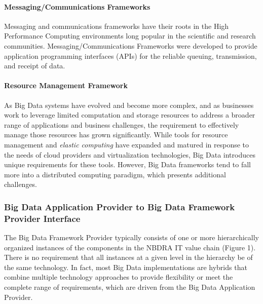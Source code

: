 \documentclass[9pt,]{article}
\let\oldparagraph\paragraph
\renewcommand{\paragraph}[1]{\oldparagraph{#1}\mbox{}}
\begin{document}
\hypertarget{messagingcommunications-frameworks}{%
\paragraph{Messaging/Communications
Frameworks}\label{messagingcommunications-frameworks}}

Messaging and communications frameworks have their roots in the High
Performance Computing environments long popular in the scientific and
research communities. Messaging/Communications Frameworks were developed
to provide application programming interfaces (APIs) for the reliable
queuing, transmission, and receipt of data.

\hypertarget{resource-management-framework}{%
\paragraph{Resource Management
Framework}\label{resource-management-framework}}

As Big Data systems have evolved and become more complex, and as
businesses work to leverage limited computation and storage resources to
address a broader range of applications and business challenges, the
requirement to effectively manage those resources has grown
significantly. While tools for resource management and \emph{elastic
computing} have expanded and matured in response to the needs of cloud
providers and virtualization technologies, Big Data introduces unique
requirements for these tools. However, Big Data frameworks tend to fall
more into a distributed computing paradigm, which presents additional
challenges.

\hypertarget{big-data-application-provider-to-big-data-framework-provider-interface}{%
\subsubsection{Big Data Application Provider to Big Data Framework
Provider
Interface}\label{big-data-application-provider-to-big-data-framework-provider-interface}}

The Big Data Framework Provider typically consists of one or more
hierarchically organized instances of the components in the NBDRA IT
value chain (Figure 1). There is no requirement that all instances at a
given level in the hierarchy be of the same technology. In fact, most
Big Data implementations are hybrids that combine multiple technology
approaches to provide flexibility or meet the complete range of
requirements, which are driven from the Big Data Application Provider.
\end{document}
